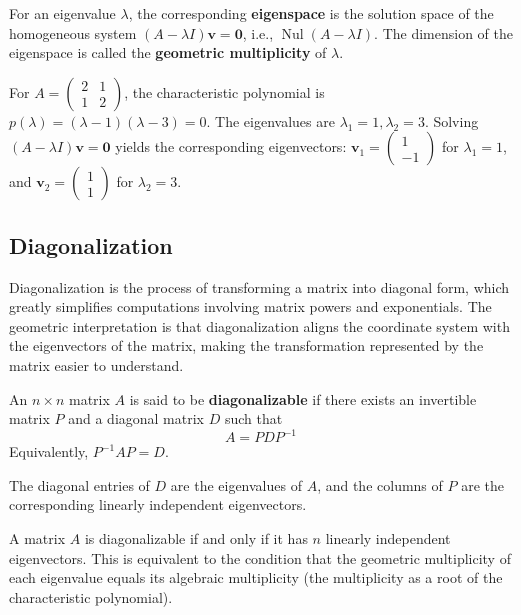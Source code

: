 \begin{definition}[Eigenspace]
For an eigenvalue $\lambda$, the corresponding \textbf{eigenspace} is the solution space of the homogeneous system $(A - \lambda I)\mathbf{v} = \mathbf{0}$, i.e., $\operatorname{Nul}(A - \lambda I)$. The dimension of the eigenspace is called the \textbf{geometric multiplicity} of $\lambda$.
\end{definition}

\begin{example}
For $A = \begin{pmatrix} 2 & 1 \\ 1 & 2 \end{pmatrix}$, the characteristic polynomial is $p(\lambda) = (\lambda-1)(\lambda-3) = 0$. 
The eigenvalues are $\lambda_1=1, \lambda_2=3$. 
Solving $(A - \lambda I)\mathbf{v} = \mathbf{0}$ yields the corresponding eigenvectors: 
$\mathbf{v}_1 = \begin{pmatrix} 1 \\ -1 \end{pmatrix}$ for $\lambda_1=1$, and $\mathbf{v}_2 = \begin{pmatrix} 1 \\ 1 \end{pmatrix}$ for $\lambda_2=3$.
\end{example}

\subsection{Diagonalization}

Diagonalization is the process of transforming a matrix into diagonal form, which greatly simplifies computations involving matrix powers and exponentials. The geometric interpretation is that diagonalization aligns the coordinate system with the eigenvectors of the matrix, making the transformation represented by the matrix easier to understand.

\begin{definition}
An $n \times n$ matrix $A$ is said to be \textbf{diagonalizable} if there exists an invertible matrix $P$ and a diagonal matrix $D$ such that
\[
A = PDP^{-1}
\]
Equivalently, $P^{-1}AP = D$.
\end{definition}

The diagonal entries of $D$ are the eigenvalues of $A$, and the columns of $P$ are the corresponding linearly independent eigenvectors.

\begin{theorem}
A matrix $A$ is diagonalizable if and only if it has $n$ linearly independent eigenvectors. This is equivalent to the condition that the geometric multiplicity of each eigenvalue equals its algebraic multiplicity (the multiplicity as a root of the characteristic polynomial).
\end{theorem}

